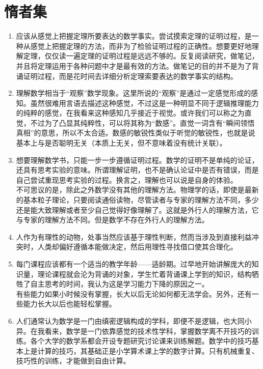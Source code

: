 \documentclass[UTF8]{ctexart}
\begin{document}
	\newpage
	
	\section{惰者集}
		\begin{enumerate}
			\item 应该从感觉上把握定理所要表达的数学事实。尝试摸索定理的证明过程，是一种从感觉上把握定理的方法，而非为了检验证明过程的正确性。想要更好地理解定理，仅仅读一遍定理的证明过程是远远不够的。反复阅读研究，做笔记，并且将定理运用于各种问题中才是最有效的方法。做笔记的目的并不是为了背诵证明过程，而是花时间去详细分析定理索要表达的数学事实的结构。
			\item 理解数学相当于“观察”数学现象。这里所说的“观察”是通过一定感觉形成的感知。虽然很难用言语去描述这种感觉，不过这是一种明显不同于逻辑推理能力的纯粹的感觉，在我看来这种感知几乎接近于视觉。或许我们可以称之为直觉，不过为了凸显其纯粹性，可以将其称为“数感”。直觉一词含有“瞬间领悟真相”的意思，所以不太合适。数感的敏锐性类似于听觉的敏锐性，也就是说基本上与是否聪明无关（本质上无关，但不意味着没有统计关联）。
			\item 想要理解数学书，只能一步一步遵循证明过程。数学的证明不是单纯的论证，还具有思考实验的意味。所谓理解证明，也不是确认论证中是否有错误，而是自己尝试重现思考实验的过程。换言之，理解也可以说是自身的体验。\\
			不可思议的是，除此之外数学没有其他的理解方法。物理学的话，即使是最新的基本粒子理论，只要阅读通俗读物，尽管读者与专家的理解方法不同，多少还是能大致理解或者至少自己觉得好像理解了。这就是外行人的理解方法，它与专家的理解方法不同。但是数学不存在外行人的理解方法。
			\item 人作为有理性的动物，处事当然应该基于理性判断，然而当涉及到直接利益冲突时，人类却偏好遵循本能做决定，然后用理性寻找借口使其合理化。
			\item 每门课程应该都有一个适当的教学年龄——适龄期。过早地开始讲解庞大的知识量，理论课程就会沦为背诵的对象，学生忙着背诵课上学到的知识，结构牺牲了自主思考的时间，我认为这是学习能力下降的原因之一。\\
			有些能力如果小时候没有掌握，长大以后无论如何都无法学会。另外，还有一些能力长大以后也能轻松掌握。
			\item 人们通常认为数学是一门由缜密逻辑构成的学科，即便不是逻辑，也大同小异。在我看来，数学是一门依靠感觉的技术性学科，掌握数学离不开技巧的训练。各个大学的数学系都会开设专题研究讨论课来训练解题。数学中的技巧基本上是计算的技巧，其基础正是小学算术课上学的数字计算。只有机械重复、技巧性的训练，才能做到自由计算。
			
		\end{enumerate}
	
\end{document}
